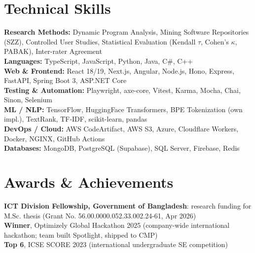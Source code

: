 \documentclass[letterpaper,11pt]{article}
\newcommand{\resumeSubHeadingListStart}{\begin{itemize}[leftmargin=0.15in, label={}]}
\newcommand{\resumeSubHeadingListEnd}{\end{itemize}}
\begin{document}
\section{Technical Skills}
  \vspace{2pt}
  \resumeSubHeadingListStart
    \small{\item{
        \textbf{Research Methods:}{ Dynamic Program Analysis, Mining Software Repositories (SZZ), Controlled User Studies, Statistical Evaluation (Kendall $\tau$, Cohen's $\kappa$, PABAK), Inter-rater Agreement} \\ \vspace{3pt}
        \textbf{Languages:}{ TypeScript, JavaScript, Python, Java, C\#, C++} \\ \vspace{3pt}
        \textbf{Web \& Frontend:}{ React 18/19, Next.js, Angular, Node.js, Hono, Express, FastAPI, Spring Boot 3, ASP.NET Core} \\ \vspace{3pt}
        \textbf{Testing \& Automation:}{ Playwright, axe-core, Vitest, Karma, Mocha, Chai, Sinon, Selenium} \\ \vspace{3pt}
        \textbf{ML / NLP:}{ TensorFlow, HuggingFace Transformers, BPE Tokenization (own impl.), TextRank, TF-IDF, scikit-learn, pandas} \\ \vspace{3pt}
        \textbf{DevOps / Cloud:}{ AWS CodeArtifact, AWS S3, Azure, Cloudflare Workers, Docker, NGINX, GitHub Actions} \\ \vspace{3pt}
        \textbf{Databases:}{ MongoDB, PostgreSQL (Supabase), SQL Server, Firebase, Redis}
    }}
  \resumeSubHeadingListEnd



\section{Awards \& Achievements}
  \vspace{2pt}
  \resumeSubHeadingListStart
    \small{\item{
        \textbf{ICT Division Fellowship, Government of Bangladesh}: research funding for M.Sc. thesis (Grant No. 56.00.0000.052.33.002.24-61, Apr 2026) \\ \vspace{3pt}
        \textbf{Winner}, Optimizely Global Hackathon 2025 (company-wide international hackathon; team built Spotlight, shipped to CMP) \\ \vspace{3pt}
        \textbf{Top 6}, ICSE SCORE 2023 (international undergraduate SE competition)
    }}
  \resumeSubHeadingListEnd


\end{document}
